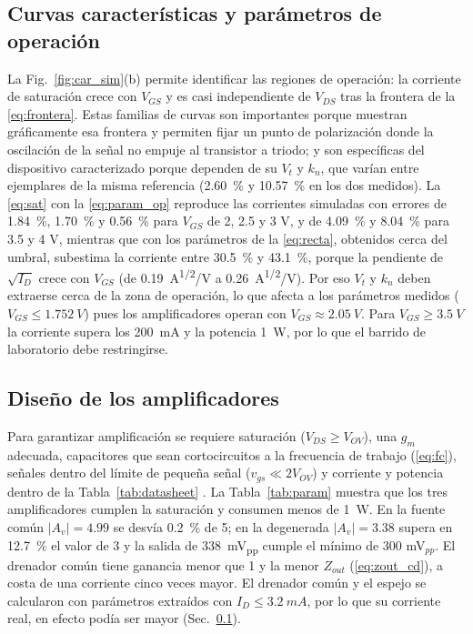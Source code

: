 \documentclass[conference]{IEEEtran}
\newcommand{\gm}{g_m}
\newcommand{\kn}{k_n}
\newcommand{\Vov}{V_{OV}}
\begin{document}
\subsection{Curvas características y parámetros de operación}
\label{sec:an_curvas}
La Fig.~\ref{fig:car_sim}(b) permite identificar las regiones de operación: la corriente de saturación crece con $V_{GS}$ y es casi independiente de $V_{DS}$ tras la frontera de la \eqref{eq:frontera}. Estas familias de curvas son importantes porque muestran gráficamente esa frontera y permiten fijar un punto de polarización donde la oscilación de la señal no empuje al transistor a triodo; y son específicas del dispositivo caracterizado porque dependen de su $V_t$ y $\kn$, que varían entre ejemplares de la misma referencia (\SI{2.60}{\percent} y \SI{10.57}{\percent} en los dos medidos). La \eqref{eq:sat} con la \eqref{eq:param_op} reproduce las corrientes simuladas con errores de \SI{1.84}{\percent}, \SI{1.70}{\percent} y \SI{0.56}{\percent} para $V_{GS}$ de 2, 2.5 y 3 V, y de \SI{4.09}{\percent} y \SI{8.04}{\percent} para 3.5 y 4 V, mientras que con los parámetros de la \eqref{eq:recta}, obtenidos cerca del umbral, subestima la corriente entre \SI{30.5}{\percent} y \SI{43.1}{\percent}, porque la pendiente de $\sqrt{I_D}$ crece con $V_{GS}$ (de \SI{0.19}{A^{1/2}/V} a \SI{0.26}{A^{1/2}/V}). Por eso $V_t$ y $\kn$ deben extraerse cerca de la zona de operación, lo que afecta a los parámetros medidos ($V_{GS}\le\SI{1.752}{V}$) pues los amplificadores operan con $V_{GS}\approx\SI{2.05}{V}$. Para $V_{GS}\ge\SI{3.5}{V}$ la corriente supera los \SI{200}{mA} y la potencia \SI{1}{W}, por lo que el barrido de laboratorio debe restringirse.

\subsection{Diseño de los amplificadores}
\label{sec:an_dis}
Para garantizar amplificación se requiere saturación ($V_{DS}\ge\Vov$), una $\gm$ adecuada, capacitores que sean cortocircuitos a la frecuencia de trabajo (\eqref{eq:fc}), señales dentro del límite de pequeña señal ($v_{gs}\ll2\Vov$) y corriente y potencia dentro de la Tabla~\ref{tab:datasheet} \cite{sedra,datasheet}. La Tabla~\ref{tab:param} muestra que los tres amplificadores cumplen la saturación y consumen menos de \SI{1}{W}. En la fuente común $|A_v|=4.99$ se desvía \SI{0.2}{\percent} de 5; en la degenerada $|A_v|=3.38$ supera en \SI{12.7}{\percent} el valor de 3 y la salida de \SI{338}{mV_{pp}} cumple el mínimo de 300 mV$_{pp}$. El drenador común tiene ganancia menor que 1 y la menor $Z_{out}$ (\eqref{eq:zout_cd}), a costa de una corriente cinco veces mayor. El drenador común y el espejo se calcularon con parámetros extraídos con $I_D\le\SI{3.2}{mA}$, por lo que su corriente real, en efecto podía ser mayor (Sec.~\ref{sec:an_curvas}).
\end{document}
